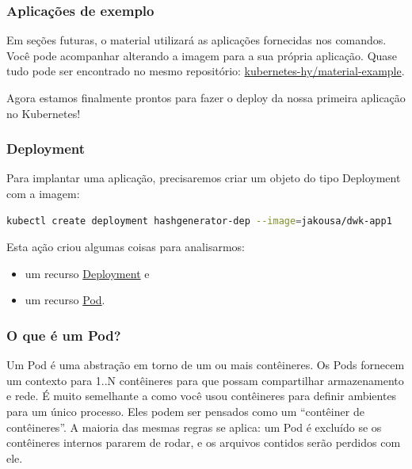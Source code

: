 \documentclass[12pt,a4paper]{article}
\begin{document}
\subsubsection{Aplicações de exemplo}
\label{sec:exemplos}

Em seções futuras, o material utilizará as aplicações fornecidas nos comandos. Você pode acompanhar alterando a imagem para a sua própria aplicação. Quase tudo pode ser encontrado no mesmo repositório: \href{https://github.com/kubernetes-hy/material-example}{kubernetes-hy/material-example}.

Agora estamos finalmente prontos para fazer o deploy da nossa primeira aplicação no Kubernetes!

\subsubsection{Deployment}
\label{sec:deployment}

Para implantar uma aplicação, precisaremos criar um objeto do tipo Deployment com a imagem:

\begin{lstlisting}[language=bash]
kubectl create deployment hashgenerator-dep --image=jakousa/dwk-app1 
\end{lstlisting}

Esta ação criou algumas coisas para analisarmos:
\begin{itemize}
    \item um recurso \href{https://kubernetes.io/docs/concepts/workloads/controllers/deployment/}{Deployment} e
    \item um recurso \href{https://kubernetes.io/docs/concepts/workloads/pods/}{Pod}.
\end{itemize}

\subsubsection{O que é um Pod?}
\label{sec:pod}

Um Pod é uma abstração em torno de um ou mais contêineres. Os Pods fornecem um contexto para 1..N contêineres para que possam compartilhar armazenamento e rede. É muito semelhante a como você usou contêineres para definir ambientes para um único processo. Eles podem ser pensados como um ``contêiner de contêineres''. A maioria das mesmas regras se aplica: um Pod é excluído se os contêineres internos pararem de rodar, e os arquivos contidos serão perdidos com ele.

\vspace{1em}
\end{document}

